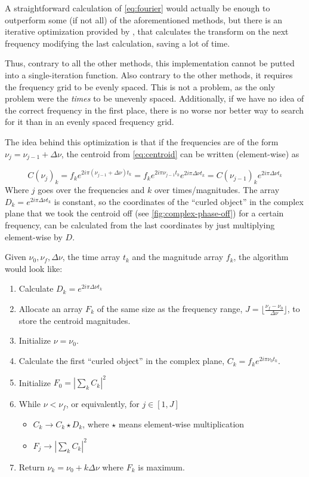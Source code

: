 A straightforward calculation of \autoref{eq:fourier} would actually be enough to outperform some (if not all) of the aforementioned methods,
but there is an iterative optimization provided by \cite{Kurtz1985}, that calculates the transform on the next frequency modifying the last calculation,
saving a lot of time.

Thus, contrary to all the other methods, this implementation cannot be putted into a single-iteration function.
Also contrary to the other methods, it requires the frequency grid to be evenly spaced. This is not a problem, 
as the only problem were the \textit{times} to be unevenly spaced.
Additionally, if we have no idea of the correct frequency in the first place, 
there is no worse nor better way to search for it than in an evenly spaced frequency grid.

The idea behind this optimization is that if the frequencies are of the form $\nu_j = \nu_{j-1} + \Delta \nu$, the centroid from \autoref{eq:centroid} 
can be written (element-wise) as

\begin{equation}
	C(\nu_j)_k = f_k e^{2i\pi (\nu_{j-1}+\Delta \nu) t_k} = f_k e^{2i\pi \nu_{j-1} t_k} e^{2i\pi \Delta \nu t_k} = C(\nu_{j-1})_k e^{2i\pi \Delta \nu t_k}
\end{equation}
Where $j$ goes over the frequencies and $k$ over times/magnitudes. 
The array $D_k = e^{2i\pi \Delta \nu t_k}$ is constant, 
so the coordinates of the \enquote{curled object} in the complex plane that we took the centroid off (see \autoref{fig:complex-phase-off})
for a certain frequency, can be calculated from the last coordinates by just multiplying element-wise by $D$.

Given $\nu_0,\nu_f,\Delta \nu$, the time array $t_k$ and the magnitude array $f_k$, the algorithm would look like:

\begin{enumerate}
	\item Calculate $D_k = e^{2i\pi \Delta \nu t_k}$
	\item Allocate an array $F_k$ of the same size as the frequency range, $J=\lfloor \frac{\nu_f-\nu_0}{\Delta \nu} \rfloor$, to store the centroid magnitudes.
	\item Initialize $\nu=\nu_0$.
	\item Calculate the first \enquote{curled object} in the complex plane, $C_k = f_k e^{2i\pi \nu_0 t_k}$.
	\item Initialize $F_0 = \left|\sum_k C_k\right|^2$
	\item While $\nu<\nu_f$, or equivalently, for $j \in [1,J]$
	\begin{itemize}
		\item $C_k \to C_k \star D_k $, where $\star$ means element-wise multiplication
		\item $F_j \to \left|\sum_k C_k\right|^2$
	\end{itemize}
	\item Return $\nu_k = \nu_0 + k \Delta \nu$ where $F_k$ is maximum. 
\end{enumerate}

